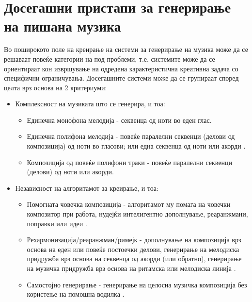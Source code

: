 \section{Досегашни пристапи за генерирање на пишана музика}
\label{sec:pristap}

Во поширокото поле на креирање на системи за генерирање на музика може да се решаваат повеќе категории на под-проблеми, т.е. системите може да се ориентираат кон извршување на одредена карактеристична креативна задача со специфични ограничувања. Досегашните системи може да се групираат според целта врз основа на 2 критериуми:
\begin{itemize}
    \item Комплексност на музиката што се генерира, и тоа: \begin{itemize}
        \item Единечна монофона мелодија - секвенца од ноти во еден глас. \cite{Biles1994,Cope1991,Zils2001,GarciaSalas2011,Schwarz2006,Eck2002,Eck2008,Tikhonov2017,Sturm2016,Bretan2016}
        \item Единечна полифона мелодија - повеќе паралелни секвенци (делови од композиција) од ноти во гласови; или една секвенца од ноти или акорди \cite{Hadjeres2016,Boulanger-Lewandowski2012, Boulanger-Lewandowski2014,Goel2014,Liang2017}.
        \item Композиција од повеќе полифони траки - повеќе паралелни секвенци (делови) од ноти или акорди. \cite{Yang2017,Dong2017,Dong2018,Johnson2017}
    \end{itemize}
    \item Независност на алгоритамот за креирање, и тоа: \begin{itemize}
        \item Помогната човечка композиција - алгоритамот му помага на човечки композитор при работа, нудејќи интелигентно дополнување, реаранжмани, поправки или идеи \cite{Ghedini2015}.
        \item Рехармонизација/реаранжман/римејк - дополнување на композиција врз основа на еден или повеќе постоечки делови, генерирање на мелодиска придружба врз основа на секвенца од акорди (или обратно), генерирање на музичка придружба врз основа на ритамска или мелодиска линија \cite{Hadjeres2016,Liang2017}.
        \item Самостојно генерирање - генерирање на целосна музичка композиција без користење на помошна водилка \cite{Boulanger-Lewandowski2012, Boulanger-Lewandowski2014,Goel2014,Yang2017,Dong2017,Dong2018,Johnson2017}.
    \end{itemize}
\end{itemize}

